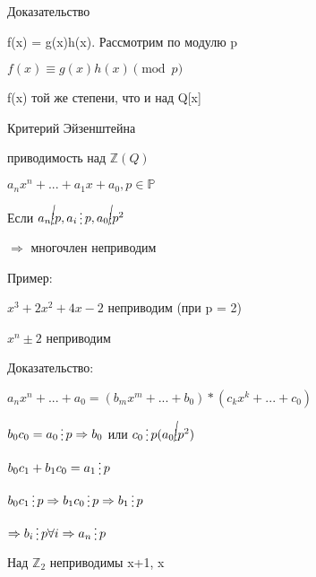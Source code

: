 \documentclass{article}
\begin{document}
Доказательство

f(x) = g(x)h(x). Рассмотрим по модулю p

$f(x)  \equiv g(x)h(x) \pmod{p}$

f(x) той же степени, что и над Q[x]

Критерий Эйзенштейна

приводимость над $\mathbb {Z} (Q)$

$a_n x^n + ... + a_1 x + a_0, p \in \mathbb {P}$

Если $a_n \cancel {\mathop{\raisebox{-2pt}{\vdots}}} p, a_i \mathop{\raisebox{-2pt}{\vdots}} p, a_0 \cancel {\mathop{\raisebox{-2pt}{\vdots}}} p^2 $

$\Rightarrow $ многочлен неприводим

Пример:

$x^3 + 2x^2 + 4x - 2$ неприводим (при p = 2)

$x^n \pm 2 $ неприводим

Доказательство:

$a_n x^n + ... + a_0 = (b_m x^m + ... + b_0) \ast (c_k x^k + ... + c_0)$

$b_0 c_0  = a_0 \mathop{\raisebox{-2pt}{\vdots}} p \Rightarrow b_0$ или $c_0 \mathop{\raisebox{-2pt}{\vdots}} p (a_0 \cancel {\mathop{\raisebox{-2pt}{\vdots}}} p^2) $

$b_0 c_1 + b_1 c_0 = a_1 \mathop{\raisebox{-2pt}{\vdots}} p$

$b_0 c_1 \mathop{\raisebox{-2pt}{\vdots}} p \Rightarrow b_1 c_0 \mathop{\raisebox{-2pt}{\vdots}} p \Rightarrow b_1 \mathop{\raisebox{-2pt}{\vdots}} p$

$\Rightarrow b_i \mathop{\raisebox{-2pt}{\vdots}} p \forall i \Rightarrow a_n \mathop{\raisebox{-2pt}{\vdots}} p$

Над $\mathbb {Z}_2$ неприводимы x+1, x
\end{document}
